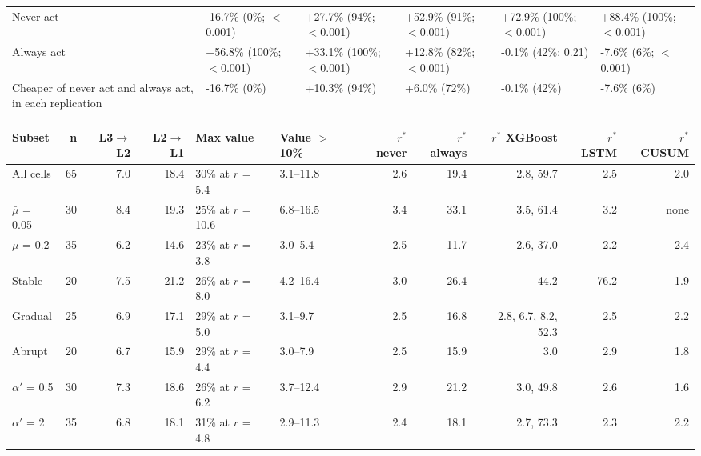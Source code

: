 \documentclass[10pt,a4paper]{article}
\begin{document}
\begin{minipage}{\linewidth}
{\begin{tabular}{llllll}
Never act & -16.7\% (0\%; $<$0.001) & +27.7\% (94\%; $<$0.001) & +52.9\% (91\%; $<$0.001) & +72.9\% (100\%; $<$0.001) & +88.4\% (100\%; $<$0.001) \\
Always act & +56.8\% (100\%; $<$0.001) & +33.1\% (100\%; $<$0.001) & +12.8\% (82\%; $<$0.001) & -0.1\% (42\%; 0.21) & -7.6\% (6\%; $<$0.001) \\
Cheaper of never act and always act, in each replication & -16.7\% (0\%) & +10.3\% (94\%) & +6.0\% (72\%) & -0.1\% (42\%) & -7.6\% (6\%) \\
\bottomrule
\end{tabular}}
\end{minipage}
\vspace{8pt}

\vspace{6pt}
\noindent\begin{minipage}{\linewidth}
\centering\scriptsize
\begin{tabular}{lrrrllrrrrr}
\toprule
Subset & n & L3$\to$L2 & L2$\to$L1 & Max value & Value $>$ 10\% & $r^{*}$ never & $r^{*}$ always & $r^{*}$ XGBoost & $r^{*}$ LSTM & $r^{*}$ CUSUM \\ \midrule
All cells & 65 & 7.0 & 18.4 & 30\% at $r$ = 5.4 & 3.1–11.8 & 2.6 & 19.4 & 2.8, 59.7 & 2.5 & 2.0 \\
$\bar{\mu}$ = 0.05 & 30 & 8.4 & 19.3 & 25\% at $r$ = 10.6 & 6.8–16.5 & 3.4 & 33.1 & 3.5, 61.4 & 3.2 & none \\
$\bar{\mu}$ = 0.2 & 35 & 6.2 & 14.6 & 23\% at $r$ = 3.8 & 3.0–5.4 & 2.5 & 11.7 & 2.6, 37.0 & 2.2 & 2.4 \\
Stable & 20 & 7.5 & 21.2 & 26\% at $r$ = 8.0 & 4.2–16.4 & 3.0 & 26.4 & 44.2 & 76.2 & 1.9 \\
Gradual & 25 & 6.9 & 17.1 & 29\% at $r$ = 5.0 & 3.1–9.7 & 2.5 & 16.8 & 2.8, 6.7, 8.2, 52.3 & 2.5 & 2.2 \\
Abrupt & 20 & 6.7 & 15.9 & 29\% at $r$ = 4.4 & 3.0–7.9 & 2.5 & 15.9 & 3.0 & 2.9 & 1.8 \\
$\alpha'$ = 0.5 & 30 & 7.3 & 18.6 & 26\% at $r$ = 6.2 & 3.7–12.4 & 2.9 & 21.2 & 3.0, 49.8 & 2.6 & 1.6 \\
$\alpha'$ = 2 & 35 & 6.8 & 18.1 & 31\% at $r$ = 4.8 & 2.9–11.3 & 2.4 & 18.1 & 2.7, 73.3 & 2.3 & 2.2 \\
\bottomrule
\end{tabular}
\end{minipage}
\vspace{8pt}
\end{document}
